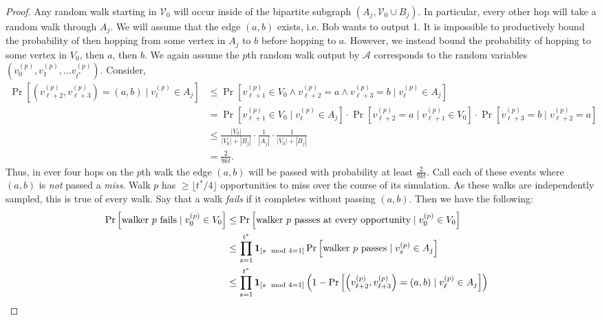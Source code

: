 \documentclass{report}
\begin{document}
\begin{proof}
Any random walk starting in $\mathcal{V}_0$ will occur inside of the bipartite subgraph $(A_j, \mathcal{V}_0 \cup B_j)$.
In particular, every other hop will take a random walk through $A_j$. 
We will assume that the edge $(a, b)$ exists, i.e. Bob wants to output 1.
It is impossible to productively bound the probability of then hopping from some vertex in $A_j$ to $b$ before hopping to $a$.
However, we instead bound the probability of hopping to some vertex in $V_0$, then $a$, then $b$.
We again assume the $p$th random walk output by $\mathcal{A}$ corresponds to the random variables $\left ( v_0^{(p)}, v_1^{(p)}, \dots v_{t^*}^{(p)} \right)$.
Consider,
%
\begin{align}
\nonumber
\Pr \left [ \left ( v_{\ell+2}^{(p)}, v_{\ell+3}^{(p)} \right ) = (a ,b) \mid v_\ell^{(p)} \in A_j \right ]
&\leq
\Pr \left [ v_{\ell+1}^{(p)} \in V_0 \wedge v_{\ell+2}^{(p)} = a \wedge v_{\ell+3}^{(p)} = b \mid v_{\ell}^{(p)} \in A_j \right ]
\\
\nonumber
&=
\Pr[v_{\ell+1}^{(p)} \in V_0 \mid v_\ell^{(p)} \in A_j] \cdot
\Pr[v_{\ell+2}^{(p)} = a \mid v_{\ell+1}^{(p)} \in V_0] \cdot
\Pr[v_{\ell+3}^{(p)} = b \mid v_{\ell+2}^{(p)} = a] 
\\
\nonumber
&\leq
\frac{|V_0|}{|V_0| + |B_j|} \cdot \frac{1}{|A_j|} \cdot \frac{1}{|V_0| + |B_j|}
\\
\label{eq:rw:lb}
&=
\frac{2}{9kt}.
\end{align}
%
Thus, in ever four hops on the $p$th walk the edge $(a,b)$ will be passed with probability at least $\frac{2}{9kt}$.
Call each of these events where $(a,b)$ is \emph{not} passed a \emph{miss}.
Walk $p$ has $\geq \lfloor t^*/4 \rfloor$ opportunities to miss over the course of its simulation.
As these walks are independently sampled, this is true of every walk. 
Say that a walk \emph{fails} if it completes without passing $(a,b)$.
Then we have the following:
%
\begin{align*}
\Pr \left [ \textnormal{walker $p$ fails} \mid v_0^{(p)} \in V_0 \right ]
&\leq
\Pr \left [ \textnormal{walker $p$ passes at every opportunity} \mid v_{0}^{(p)} \in V_0 \right ]
&
\\
&\leq
\prod\limits_{s = 1}^{t^*} 
\mathbf{1}_{[s\mod 4 = 1]}
\Pr \left [ \textnormal{walker $p$ passes} \mid v_{s}^{(p)} \in A_j \right ]
&
\\
&\leq
\prod\limits_{s = 1}^{t^*} 
\mathbf{1}_{[s\mod 4 = 1]}
\left ( 1 - \Pr \left [ \left ( v_{\ell+2}^{(p)}, v_{\ell+3}^{(p)} \right ) = (a ,b) \mid v_\ell^{(p)} \in A_j \right ] \right )
&
\\

\end{align*}
\end{proof}
\end{document}
